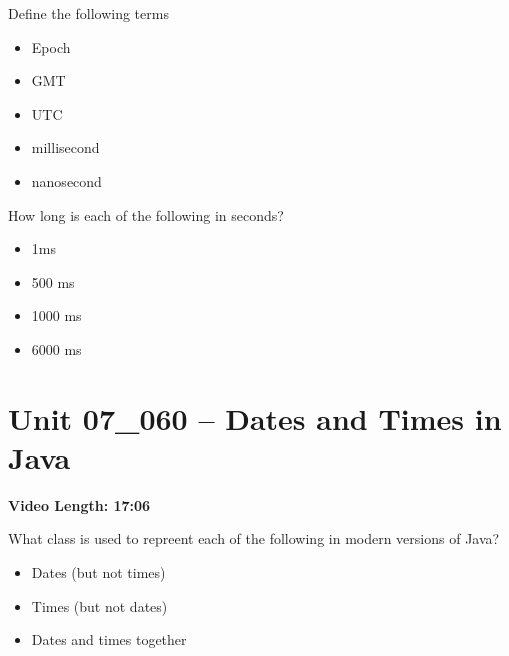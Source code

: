 \documentclass[letterpaper,12pt]{exam}
\newcommand{\unit}{Unit 07}
\begin{document}
\begin{questions}
\begin{samepage}
    \question Define the following terms
      \begin{itemize} 
        \item Epoch
        \vspace{5mm}
        \item GMT
        \vspace{5mm} 
        \item UTC
        \vspace{5mm} 
        \item millisecond 
        \vspace{5mm} 
        \item nanosecond
       \end{itemize}
\end{samepage}

\begin{samepage}
    \question How long is each of the following in seconds?
      \begin{itemize}
        \item 1ms
        \vspace{5mm}
        \item 500 ms
        \vspace{5mm}
        \item 1000 ms
        \vspace{5mm}
        \item 6000 ms
        \vspace{5mm}
       \end{itemize}
\end{samepage}


\section*{\unit\_060 -- Dates and Times in Java} %
\noindent \textbf{Video Length: 17:06}

\begin{samepage}
    \question What class is used to repreent each of the following in modern versions of Java?
      \begin{itemize}  
        \item Dates (but not times)
        \vspace{5mm}
        \item Times (but not dates)       
        \vspace{5mm}
        \item Dates and times together
       \end{itemize}
\end{samepage}


\end{questions}
\end{document}
